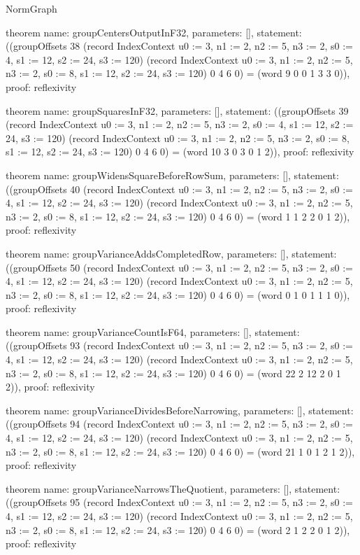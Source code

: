 \begin{lexlean}{NormGraph}
\begin{semanticmodule}
theorem{
  name: groupCentersOutputInF32,
  parameters: [],
  statement: ((groupOffsets 38 (record IndexContext {u0 := 3, n1 := 2, n2 := 5, n3 := 2, s0 := 4, s1 := 12, s2 := 24, s3 := 120}) (record IndexContext {u0 := 3, n1 := 2, n2 := 5, n3 := 2, s0 := 8, s1 := 12, s2 := 24, s3 := 120}) 0 4 6 0) = (word 9 0 0 1 3 3 0)),
  proof: reflexivity{}
}

theorem{
  name: groupSquaresInF32,
  parameters: [],
  statement: ((groupOffsets 39 (record IndexContext {u0 := 3, n1 := 2, n2 := 5, n3 := 2, s0 := 4, s1 := 12, s2 := 24, s3 := 120}) (record IndexContext {u0 := 3, n1 := 2, n2 := 5, n3 := 2, s0 := 8, s1 := 12, s2 := 24, s3 := 120}) 0 4 6 0) = (word 10 3 0 3 0 1 2)),
  proof: reflexivity{}
}

theorem{
  name: groupWidensSquareBeforeRowSum,
  parameters: [],
  statement: ((groupOffsets 40 (record IndexContext {u0 := 3, n1 := 2, n2 := 5, n3 := 2, s0 := 4, s1 := 12, s2 := 24, s3 := 120}) (record IndexContext {u0 := 3, n1 := 2, n2 := 5, n3 := 2, s0 := 8, s1 := 12, s2 := 24, s3 := 120}) 0 4 6 0) = (word 1 1 2 2 0 1 2)),
  proof: reflexivity{}
}

theorem{
  name: groupVarianceAddsCompletedRow,
  parameters: [],
  statement: ((groupOffsets 50 (record IndexContext {u0 := 3, n1 := 2, n2 := 5, n3 := 2, s0 := 4, s1 := 12, s2 := 24, s3 := 120}) (record IndexContext {u0 := 3, n1 := 2, n2 := 5, n3 := 2, s0 := 8, s1 := 12, s2 := 24, s3 := 120}) 0 4 6 0) = (word 0 1 0 1 1 1 0)),
  proof: reflexivity{}
}

theorem{
  name: groupVarianceCountIsF64,
  parameters: [],
  statement: ((groupOffsets 93 (record IndexContext {u0 := 3, n1 := 2, n2 := 5, n3 := 2, s0 := 4, s1 := 12, s2 := 24, s3 := 120}) (record IndexContext {u0 := 3, n1 := 2, n2 := 5, n3 := 2, s0 := 8, s1 := 12, s2 := 24, s3 := 120}) 0 4 6 0) = (word 22 2 12 2 0 1 2)),
  proof: reflexivity{}
}

theorem{
  name: groupVarianceDividesBeforeNarrowing,
  parameters: [],
  statement: ((groupOffsets 94 (record IndexContext {u0 := 3, n1 := 2, n2 := 5, n3 := 2, s0 := 4, s1 := 12, s2 := 24, s3 := 120}) (record IndexContext {u0 := 3, n1 := 2, n2 := 5, n3 := 2, s0 := 8, s1 := 12, s2 := 24, s3 := 120}) 0 4 6 0) = (word 21 1 0 1 2 1 2)),
  proof: reflexivity{}
}

theorem{
  name: groupVarianceNarrowsTheQuotient,
  parameters: [],
  statement: ((groupOffsets 95 (record IndexContext {u0 := 3, n1 := 2, n2 := 5, n3 := 2, s0 := 4, s1 := 12, s2 := 24, s3 := 120}) (record IndexContext {u0 := 3, n1 := 2, n2 := 5, n3 := 2, s0 := 8, s1 := 12, s2 := 24, s3 := 120}) 0 4 6 0) = (word 2 1 2 2 0 1 2)),
  proof: reflexivity{}
}


\end{semanticmodule}
\end{lexlean}
